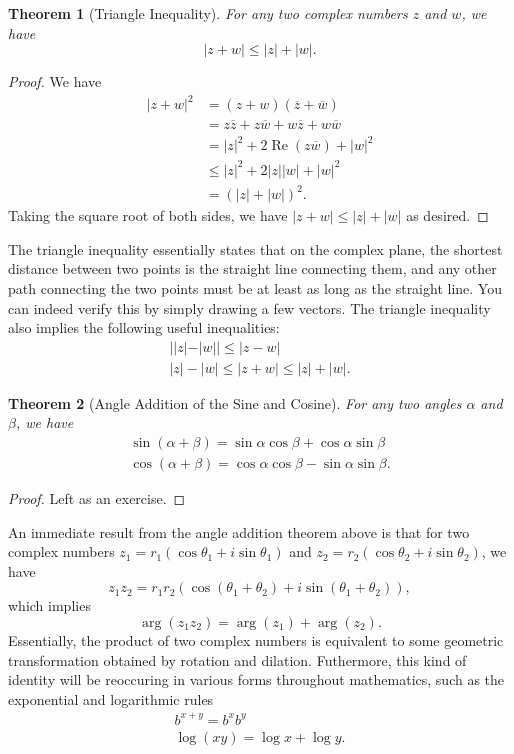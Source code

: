 \documentclass[11pt,oneside,reqno]{amsart}
\numberwithin{equation}{section}
\newtheorem{theorem}{Theorem}[section]
\theoremstyle{definition}
\theoremstyle{remark}
\begin{document}
\begin{theorem}[Triangle Inequality]
    For any two complex numbers $z$ and $w$, we have
    \[|z + w| \leq |z| + |w|.\]
\end{theorem}
\begin{proof}
    We have
    \begin{align*}
        |z + w|^2 &= (z + w)(\overline{z} + \overline{w}) \\
        &= z\overline{z} + z\overline{w} + w\overline{z} + w\overline{w} \\
        &= |z|^2 + 2\operatorname{Re}(z\overline{w}) + |w|^2 \\
        &\leq |z|^2 + 2|z||w| + |w|^2 \\
        &= (|z| + |w|)^2.
    \end{align*}
    Taking the square root of both sides, we have $|z + w| \leq |z| + |w|$ as desired.
\end{proof}
The triangle inequality essentially states that on the complex plane, the shortest distance between two points is the straight line connecting them, and any other path connecting the two points must be at least as long as the straight line.
You can indeed verify this by simply drawing a few vectors. The triangle inequality also implies the following useful inequalities:
\begin{gather*}
    ||z| - |w|| \leq |z - w| \\
    |z| - |w| \leq |z + w| \leq |z| + |w|.
\end{gather*}

\begin{theorem}[Angle Addition of the Sine and Cosine]\label{thm:angleadd}
    For any two angles $\alpha$ and $\beta$, we have
    \begin{gather*}
        \sin(\alpha + \beta) = \sin\alpha\cos\beta + \cos\alpha\sin\beta \\
        \cos(\alpha + \beta) = \cos\alpha\cos\beta - \sin\alpha\sin\beta.
    \end{gather*}
\end{theorem}
\begin{proof}
    Left as an exercise.  
\end{proof}

An immediate result from the angle addition theorem above is that for two complex numbers $z_1 = r_1(\cos\theta_1 + i\sin\theta_1)$ and $z_2 = r_2(\cos\theta_2 + i\sin\theta_2)$, we have
\[z_1z_2 = r_1r_2(\cos(\theta_1 + \theta_2) + i\sin(\theta_1 + \theta_2)),\]
which implies 
\[\arg(z_1z_2) = \arg(z_1) + \arg(z_2).\]
Essentially, the product of two complex numbers is equivalent to some geometric transformation obtained by rotation and dilation. Futhermore, this kind of identity 
will be reoccuring in various forms throughout mathematics, such as the exponential and logarithmic rules 
\begin{gather*}
    b^{x+y} = b^xb^y \\
    \log(xy) = \log x + \log y.
\end{gather*}
\end{document}
